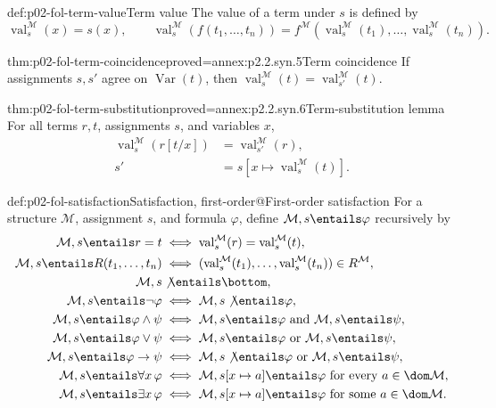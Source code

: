 \begin{hbdefinition}{def:p02-fol-term-value}{Term value}
The value of a term under \(s\) is defined by
\[
 \operatorname{val}^{\mathcal M}_s(x)=s(x),\qquad
 \operatorname{val}^{\mathcal M}_s(f(t_1,\ldots,t_n))
 =f^{\mathcal M}(\operatorname{val}^{\mathcal M}_s(t_1),\ldots,
                  \operatorname{val}^{\mathcal M}_s(t_n)).
\]
\end{hbdefinition}

\begin{hblemma}{thm:p02-fol-term-coincidence}{proved=annex:p2.2.syn.5}{Term coincidence}
If assignments \(s,s'\) agree on \(\operatorname{Var}(t)\), then
\(\operatorname{val}^{\mathcal M}_s(t)
=\operatorname{val}^{\mathcal M}_{s'}(t)\).
\end{hblemma}

\begin{hblemma}{thm:p02-fol-term-substitution}{proved=annex:p2.2.syn.6}{Term-substitution lemma}
For all terms \(r,t\), assignments \(s\), and variables \(x\),
\[
\begin{aligned}
 \operatorname{val}^{\mathcal M}_s(r[t/x])
 &=\operatorname{val}^{\mathcal M}_{s'}(r),\\
 s'&=s[x\mapsto\operatorname{val}^{\mathcal M}_s(t)].
\end{aligned}
\]
\end{hblemma}

\begin{hbdefinition}{def:p02-fol-satisfaction}{Satisfaction, first-order@First-order satisfaction}
For a structure \(\mathcal M\), assignment \(s\), and formula \(\varphi\),
define \(\mathcal M,s\entails\varphi\) recursively by
\[
\begin{aligned}
 \mathcal M,s\entails r=t
 &\iff\operatorname{val}^{\mathcal M}_s(r)
       =\operatorname{val}^{\mathcal M}_s(t),\\
 \mathcal M,s\entails R(t_1,\ldots,t_n)
 &\iff(\operatorname{val}^{\mathcal M}_s(t_1),\ldots,
        \operatorname{val}^{\mathcal M}_s(t_n))\in R^{\mathcal M},\\
 \mathcal M,s&\not\entails\bottom,\\
 \mathcal M,s\entails\neg\varphi
 &\iff\mathcal M,s\not\entails\varphi,\\
 \mathcal M,s\entails\varphi\land\psi
 &\iff\mathcal M,s\entails\varphi\text{ and }\mathcal M,s\entails\psi,\\
 \mathcal M,s\entails\varphi\lor\psi
 &\iff\mathcal M,s\entails\varphi\text{ or }\mathcal M,s\entails\psi,\\
 \mathcal M,s\entails\varphi\to\psi
 &\iff\mathcal M,s\not\entails\varphi\text{ or }\mathcal M,s\entails\psi,\\
 \mathcal M,s\entails\forall x\,\varphi
 &\iff\mathcal M,s[x\mapsto a]\entails\varphi
       \text{ for every }a\in\dom\mathcal M,\\
 \mathcal M,s\entails\exists x\,\varphi
 &\iff\mathcal M,s[x\mapsto a]\entails\varphi
       \text{ for some }a\in\dom\mathcal M.
\end{aligned}
\]
\end{hbdefinition}

